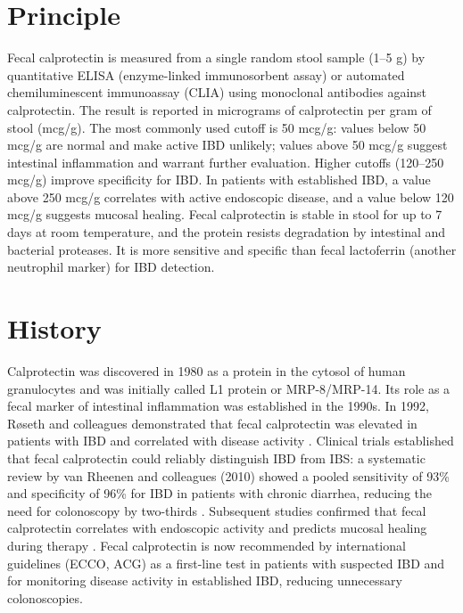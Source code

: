 \section*{Principle}
Fecal calprotectin is measured from a single random stool sample (1--5 g) by quantitative ELISA (enzyme-linked immunosorbent assay) or automated chemiluminescent immunoassay (CLIA) using monoclonal antibodies against calprotectin. The result is reported in micrograms of calprotectin per gram of stool (mcg/g). The most commonly used cutoff is 50 mcg/g: values below 50 mcg/g are normal and make active IBD unlikely; values above 50 mcg/g suggest intestinal inflammation and warrant further evaluation. Higher cutoffs (120--250 mcg/g) improve specificity for IBD. In patients with established IBD, a value above 250 mcg/g correlates with active endoscopic disease, and a value below 120 mcg/g suggests mucosal healing. Fecal calprotectin is stable in stool for up to 7 days at room temperature, and the protein resists degradation by intestinal and bacterial proteases. It is more sensitive and specific than fecal lactoferrin (another neutrophil marker) for IBD detection.

\section*{History}
Calprotectin was discovered in 1980 as a protein in the cytosol of human granulocytes and was initially called L1 protein or MRP-8/MRP-14. Its role as a fecal marker of intestinal inflammation was established in the 1990s. In 1992, Røseth and colleagues demonstrated that fecal calprotectin was elevated in patients with IBD and correlated with disease activity \cite{roseth1997}. Clinical trials established that fecal calprotectin could reliably distinguish IBD from IBS: a systematic review by van Rheenen and colleagues (2010) showed a pooled sensitivity of 93\% and specificity of 96\% for IBD in patients with chronic diarrhea, reducing the need for colonoscopy by two-thirds \cite{vanrheenen2010}. Subsequent studies confirmed that fecal calprotectin correlates with endoscopic activity and predicts mucosal healing during therapy \cite{dhaens2012}. Fecal calprotectin is now recommended by international guidelines (ECCO, ACG) as a first-line test in patients with suspected IBD and for monitoring disease activity in established IBD, reducing unnecessary colonoscopies.

